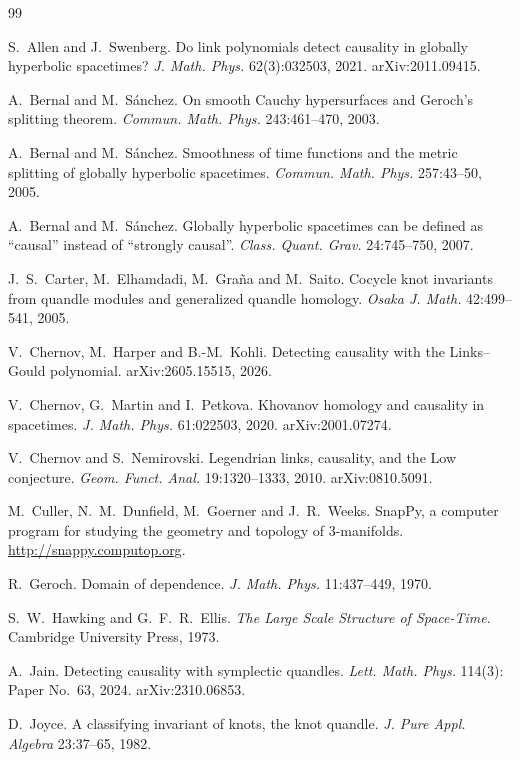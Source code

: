 \documentclass[11pt]{article}
\theoremstyle{definition}
\begin{document}
\begin{thebibliography}{99}

 S.~Allen and J.~Swenberg. Do link polynomials detect causality in globally hyperbolic
spacetimes? \emph{J. Math. Phys.} 62(3):032503, 2021. arXiv:2011.09415.

 A.~Bernal and M.~S\'anchez. On smooth Cauchy hypersurfaces and Geroch's splitting theorem.
\emph{Commun. Math. Phys.} 243:461--470, 2003.

 A.~Bernal and M.~S\'anchez. Smoothness of time functions and the metric splitting of
globally hyperbolic spacetimes. \emph{Commun. Math. Phys.} 257:43--50, 2005.

 A.~Bernal and M.~S\'anchez. Globally hyperbolic spacetimes can be defined as ``causal''
instead of ``strongly causal''. \emph{Class. Quant. Grav.} 24:745--750, 2007.

 J.~S.~Carter, M.~Elhamdadi, M.~Gra\~na and M.~Saito. Cocycle knot invariants from quandle
modules and generalized quandle homology. \emph{Osaka J. Math.} 42:499--541, 2005.

 V.~Chernov, M.~Harper and B.-M.~Kohli. Detecting causality with the Links--Gould
polynomial. arXiv:2605.15515, 2026.

 V.~Chernov, G.~Martin and I.~Petkova. Khovanov homology and causality in spacetimes.
\emph{J. Math. Phys.} 61:022503, 2020. arXiv:2001.07274.

 V.~Chernov and S.~Nemirovski. Legendrian links, causality, and the Low conjecture.
\emph{Geom. Funct. Anal.} 19:1320--1333, 2010. arXiv:0810.5091.

 M.~Culler, N.~M.~Dunfield, M.~Goerner and J.~R.~Weeks. SnapPy, a computer program for
studying the geometry and topology of 3-manifolds. \url{http://snappy.computop.org}.

 R.~Geroch. Domain of dependence. \emph{J. Math. Phys.} 11:437--449, 1970.

 S.~W.~Hawking and G.~F.~R.~Ellis. \emph{The Large Scale Structure of Space-Time}.
Cambridge University Press, 1973.

 A.~Jain. Detecting causality with symplectic quandles. \emph{Lett. Math. Phys.} 114(3):
Paper No.~63, 2024. arXiv:2310.06853.

 D.~Joyce. A classifying invariant of knots, the knot quandle. \emph{J. Pure Appl.
Algebra} 23:37--65, 1982.


\end{thebibliography}
\end{document}
